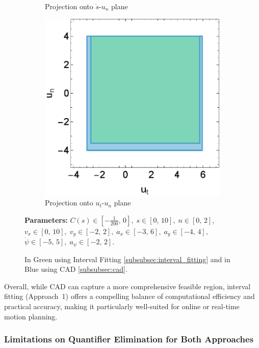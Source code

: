 \begin{figure}[ht]
\begin{subfigure}[b]{0.32\textwidth}
		\caption{Projection onto $\dot{s}$-$u_n$ plane}
	\end{subfigure}
	\begin{subfigure}[b]{0.32\textwidth}
		\centering
		\includegraphics[width=\textwidth]{figures/inner_polytope/region_u1u2_plot_gr1.eps}
		\caption{Projection onto $u_t$-$u_n$ plane}
	\end{subfigure}
	\caption{In Green using Interval Fitting \ref{subsubsec:interval_fitting} and in Blue using CAD \ref{subsubsec:cad}.}
	\textbf{Parameters:} $C(s) \in \left[-\tfrac{1}{200},\, 0\right],\; s \in [0,\,10],\; n \in [0,\,2],\;$ \newline $v_x \in [0,\,10],\; v_y \in [-2,\,2],\; a_x \in [-3,\,6],\; a_y \in [-4,\,4],\;$ \newline $\dot{\psi} \in [-5,\,5],\; a_{\psi} \in [-2,\,2].$
	\label{fig:qe-comparison-with-params}
\end{figure}

Overall, while CAD can capture a more comprehensive feasible region, interval fitting (Approach~1) offers a compelling balance of computational
efficiency and practical accuracy, making it particularly well-suited for online or real-time motion planning.

\subsubsection{Limitations on Quantifier Elimination for Both Approaches}
\label{subsubsec:limitations_on_qe}

